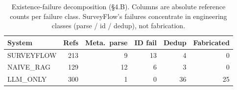 \begin{table}[t]
\centering
\small
\caption{Existence-failure decomposition (§4.B). Columns are absolute reference counts per failure class. SurveyFlow's failures concentrate in engineering classes (parse / id / dedup), not fabrication.}
\label{tab:failure-decomp}
\begin{tabular}{lrrrrr}
\toprule
System & Refs & Meta.\ parse & ID fail & Dedup & Fabricated \\
\midrule
SURVEYFLOW & 213 & 9 & 13 & 4 & 0 \\
NAIVE_RAG & 129 & 12 & 6 & 3 & 0 \\
LLM_ONLY & 300 & 1 & 0 & 36 & 25 \\
\bottomrule
\end{tabular}
\end{table}
